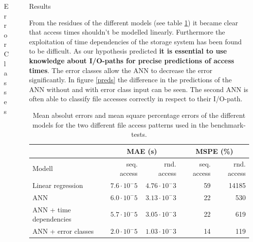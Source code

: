 \documentclass[final]{beamer}
\newlength{\sepwid}
\newlength{\onecolwid}
\begin{document}
\begin{frame}[t]
\begin{columns}[t]
\begin{column}{\onecolwid}
\begin{block}{Error Classes}

\end{block}

\end{column} %

\begin{column}{\sepwid}\end{column} %

\begin{column}{\onecolwid} %

\begin{block}{Results}
	
	From the residues of the different models (see table \ref{residues}) it became clear that access times shouldn't be modelled linearly.
	Furthermore the exploitation of time dependencies of the storage system has been found to be difficult.
	As our hypothesis predicted \textbf{it is essential to use knowledge about I/O-paths for precise predictions of access times}.
	The error classes allow the ANN to decrease the error significantly.
	In figure \ref{preds} the difference in the predictions of the ANN without and with error class input can be seen.
	The second ANN is often able to classify file accesses correctly in respect to their I/O-path.
	
	\begin{table}
		\scriptsize
		\vspace{0.4cm}
		\begin{tabular}{l|r|r|r|r}%
			&  \multicolumn{2}{|c}{MAE (s)}&  \multicolumn{2}{|c}{MSPE (\%)}\\ \hline
			Modell & seq. access & rnd. access & seq. access & rnd. access\\ \hline
			Linear regression & $7.6\cdot 10^-5$ & $4.76\cdot 10^-3$ & 59 & 14185  \\
			ANN & $6.0\cdot 10^-5$ & $3.13\cdot 10^-3$ & 22 & 530 \\
			ANN + time dependencies & $5.7\cdot 10^-5$ & $3.05\cdot 10^-3$ & 22 & 619\\
			ANN + error classes & $2.0\cdot 10^-5$ & $1.03\cdot 10^-3$ & 14 & 119\\
		\end{tabular}
		\caption{Mean absolut errors and mean square percentage errors of the different models for the two different file access patterns used in the benchmark-tests.}
		\label{residues}
	\end{table}
	

\end{block}
\end{column}
\end{columns}
\end{frame}
\end{document}
